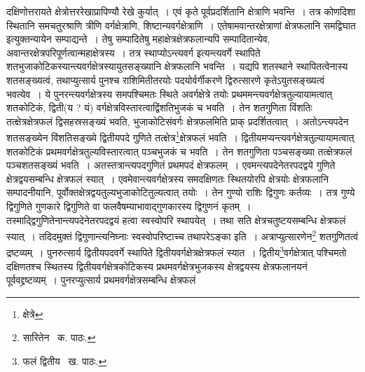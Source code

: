 \documentclass[11pt, openany]{book}
\begin{document}
\noindent दक्षिणोत्तरायते क्षेत्रोत्तररेखाप्रापिण्यौ रेखे कुर्यात्~। एवं कृते पूर्वप्रदर्शितानि क्षेत्राणि भवन्ति~। तत्र कोणदिशा स्थितानि समचतुरश्राणि त्रीणि वर्गक्षेत्राणि, शिष्टान्यवर्गक्षेत्राणि~। एतेषामवान्तरक्षेत्राणां क्षेत्रफलानि {\qt समद्विघात} इत्युक्तन्यायेन सम्पाद्यन्ते~। तेषु सम्पादितेषु महाक्षेत्रक्षेत्रफलान्यपि सम्पादितान्येव, अवान्तरक्षेत्रपरिपूर्णत्वान्महाक्षेत्रस्य~। तत्र {\qt स्थाप्योऽन्त्यवर्ग} इत्यन्त्यवर्गे स्थापिते
शतभुजाकोटिकस्यान्त्यवर्गक्षेत्रस्यायुतसङ्ख्यानि क्षेत्रफलानि भवन्ति~। यद्यपि शतस्थाने स्थापितत्वेनास्य शतसङ्ख्यत्वं, तथा{\qt प्युत्सार्य पुनश्च राशिमि}तीतरयोः पदयोर्वर्गीकरणे द्विरुत्सारणे कृतेऽयुतसङ्ख्यत्वं भवत्येव~। ये पुनरन्त्यवर्गक्षेत्रस्य समपश्चिमतः स्थिते अवर्गक्षेत्रे तयोः प्रथममन्त्यवर्गक्षेत्रतुल्यायामत्वात् शतकोटिकं, द्विती(य ? यं) वर्गक्षेत्रविस्तारत्वाद्विंशतिभुजकं च भवति~। तेन शतगुणिता विंशतिः तत्क्षेत्रक्षेत्रफलं द्विसहस्रसङ्ख्यं भवति, भुजाकोटिसंवर्गः क्षेत्रफलमिति प्राक् प्रदर्शितत्वात्~। अतोऽन्त्यपदेन शतसङ्ख्येन विंशतिसङ्ख्ये द्वितीयपदे गुणिते तत्क्षेत्र\renewcommand{\thefootnote}{१}\footnote{क्षेत्रे}क्षेत्रफलं भवति~। द्वितीयमप्यन्त्यवर्गक्षेत्रतुल्यायामत्वात् शतकोटिकं प्रथमवर्गक्षेत्रतुल्यविस्तारत्वात् पञ्चभुजकं च भवति~। तेन शतगुणिता पञ्चसङ्ख्या तत्क्षेत्रफलं पञ्चशतसङ्ख्यं भवति~। अतस्तत्रान्त्यपदगुणितं प्रथमपदं क्षेत्रफलम्~। एवमन्त्यपदेनेतरपदद्वये गुणिते क्षेत्रद्वयसम्बन्धि क्षेत्रफलं स्यात्~। एवमेवान्त्यवर्गक्षेत्रस्य समदक्षिणतः स्थितयोरपि क्षेत्रयोः क्षेत्रफलानि सम्पादनीयानि, पूर्वोक्तक्षेत्रद्वयतुल्यभुजाकोटितुल्यत्वात् तयोः~। तेन गुण्यो राशिः द्विगुणः कर्तव्यः~। तत्र गुण्ये द्विगुणिते गुणकारे द्विगुणिते वा फलवैषम्याभावाद्गुणकारस्य द्विगुणनं कृतम्~। तस्माद्द्विगुणितेनान्त्यपदेनेतरपदद्वयं हत्वा स्वस्वोपरि स्थापयेत्~। तथा सति क्षेत्रचतुष्टयसम्बन्धि क्षेत्रफलं स्यात्~। तदिदमुक्तं {\qt द्विगुणान्त्यनिघ्नाः स्वस्वोपरिष्टाच्च तथापरेऽङ्का} इति~। अत्राप्युत्सारणेन\renewcommand{\thefootnote}{२}\footnote{सारितेन \textendash\ क. पाठः.} शतगुणितत्वं द्रष्टव्यम्~। पुनरुत्सार्य द्वितीयपदवर्गे स्थापिते द्वितीयवर्गक्षेत्रक्षेत्रफलं स्यात~। द्वितीय\renewcommand{\thefootnote}{३}\footnote{फलं द्वितीय \textendash\ ख. पाठः.}वर्गक्षेत्रात् पश्चिमतो दक्षिणतश्च स्थितस्य द्वितीयवर्गक्षेत्रकोटिकस्य प्रथमवर्गक्षेत्रभुजकस्य क्षेत्रद्वयस्य क्षेत्रफलानयनं पूर्ववद्द्रष्टव्यम्~। पुनरप्युत्सार्य प्रथमवर्गक्षेत्रसम्बन्धि क्षेत्रफलं

\newpage
\end{document}
